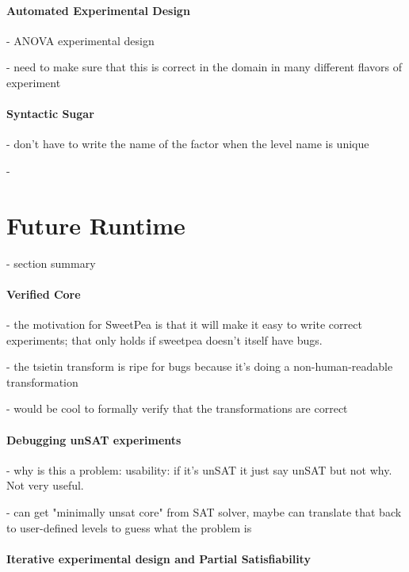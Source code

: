 \paragraph*{Automated Experimental Design}

- ANOVA experimental design

- need to make sure that this is correct in the domain in many different flavors of experiment

\paragraph*{Syntactic Sugar}

- don't have to write the name of the factor when the level name is unique

-

\section{Future Runtime}

- section summary

\paragraph*{Verified Core}

- the motivation for SweetPea is that it will make it easy to write correct experiments; that only holds if sweetpea doesn't itself have bugs.

- the tsietin transform is ripe for bugs because it's doing a non-human-readable transformation

- would be cool to formally verify that the transformations are correct


\paragraph*{Debugging unSAT experiments}

- why is this a problem: usability: if it's unSAT it just say unSAT but not why. Not very useful.

- can get "minimally unsat core" from SAT solver, maybe can translate that back to user-defined levels to guess what the problem is

\paragraph*{Iterative experimental design and Partial Satisfiability}

